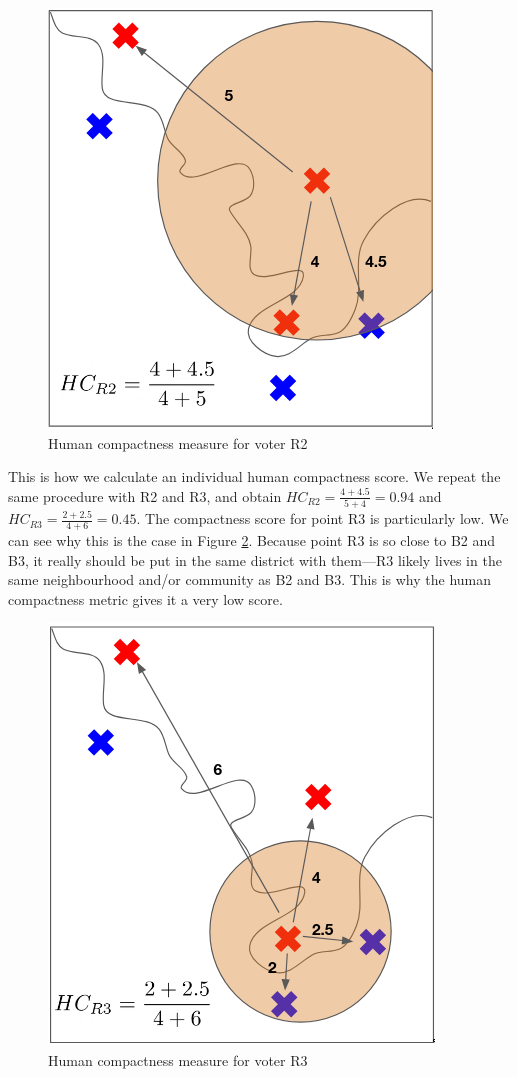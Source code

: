 \documentclass[]{article}
\begin{document}
\begin{figure}
\centering
\includegraphics{img/human_compactness_2b.png}
\caption{Human compactness measure for voter R2 \label{hc_r2}}
\end{figure}

This is how we calculate an individual human compactness score. We
repeat the same procedure with R2 and R3, and obtain
\(HC_{R2} = \frac{4 + 4.5}{5+4}=0.94\) and
\(HC_{R3} = \frac{2 + 2.5}{4+6} = 0.45\). The compactness score for
point R3 is particularly low. We can see why this is the case in Figure
\ref{hc_r3}. Because point R3 is so close to B2 and B3, it really should
be put in the same district with them---R3 likely lives in the same
neighbourhood and/or community as B2 and B3. This is why the human
compactness metric gives it a very low score.

\begin{figure}
\centering
\includegraphics{img/human_compactness_2c.png}
\caption{Human compactness measure for voter R3 \label{hc_r3}}
\end{figure}
\end{document}
